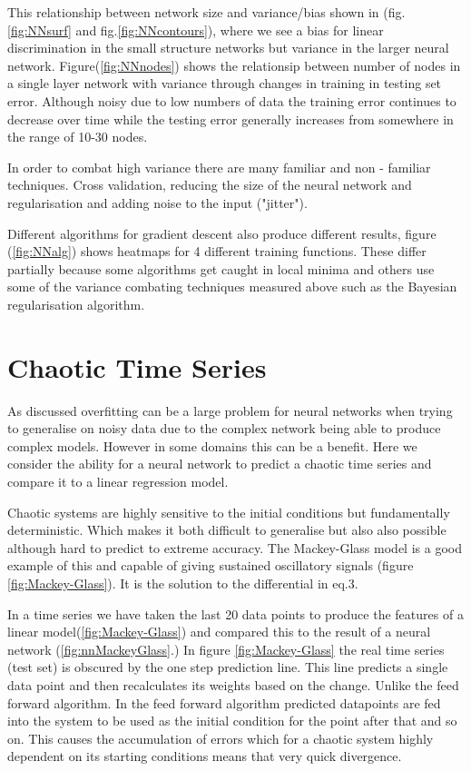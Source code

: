 \documentclass[a4paper,10pt, twocolumn]{article}
\begin{document}
This relationship between network size and variance/bias shown in (fig.\ref{fig:NNsurf} and fig.\ref{fig:NNcontours}), where we see a bias for linear discrimination in the small structure networks but variance in the larger neural network. Figure(\ref{fig:NNnodes}) shows the relationsip between number of nodes in a single layer network with variance through changes in training in testing set error. Although noisy due to low numbers of data the training error continues to decrease over time while the testing error generally increases from somewhere in the range of 10-30 nodes. 

In order to combat high variance there are many familiar and non - familiar techniques. Cross validation, reducing the size of the neural network and regularisation and adding noise to the input ("jitter"). 

Different algorithms for gradient descent also produce different results, figure (\ref{fig:NNalg}) shows heatmaps for 4 different training functions. These differ partially because some algorithms get caught in local minima and others use some of the variance combating techniques measured above such as the Bayesian regularisation algorithm. 

\section{Chaotic Time Series}

As discussed overfitting can be a large problem for neural networks when trying to generalise on noisy data due to the complex network being able to produce complex models. However in some domains this can be a benefit. Here we consider the ability for a neural network to predict a chaotic time series and compare it to a linear regression model. 

Chaotic systems are highly sensitive to the initial conditions but fundamentally deterministic. Which makes it both difficult to generalise but also also possible although hard to predict to extreme accuracy. The Mackey-Glass model is a good example of this and capable of giving sustained oscillatory signals (figure \ref{fig:Mackey-Glass}). It is the solution to the differential in eq.3. 

In a time series we have taken the last 20 data points to produce the features of a linear model(\ref{fig:Mackey-Glass}) and compared this to the result of a neural network (\ref{fig:nnMackeyGlass}.) In  figure \ref{fig:Mackey-Glass} the real time series (test set) is obscured by the one step prediction line. This line predicts a single data point and then recalculates its weights based on the change. Unlike the feed forward algorithm. In the feed forward algorithm predicted datapoints are fed into the system to be used as the initial condition for the point after that and so on. This causes the accumulation of errors which for a chaotic system highly dependent on its starting conditions means that very quick divergence. 
\end{document}
